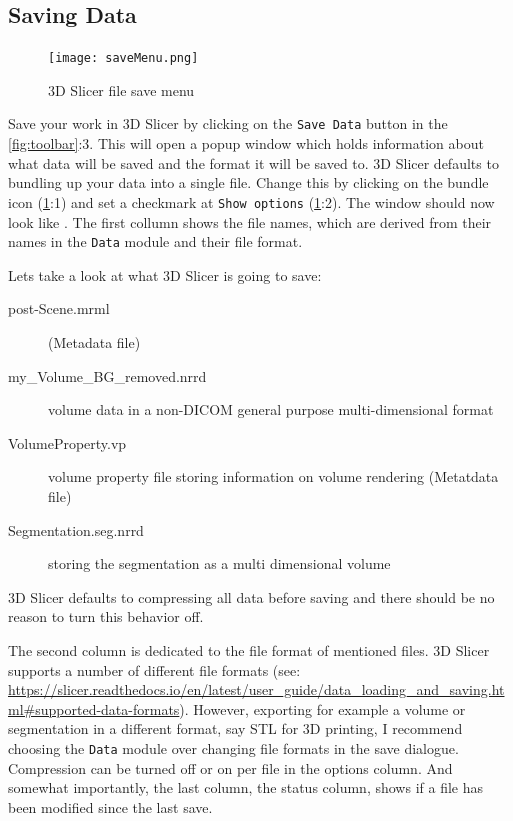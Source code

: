 \subsection{Saving Data}
\begin{figure}[h!]
	\centerline{
		\texttt{[image: saveMenu.png]}}
	\caption{3D Slicer file save menu}\label{fig:save}
\end{figure}
Save your work in 3D Slicer by clicking on the \texttt{Save Data} button in the \cref{fig:toolbar}:3.
This will open a popup window which holds information about what data will be saved and the format it will be saved to.
3D Slicer defaults to bundling up your data into a single file. Change this by clicking on the bundle icon (\cref{fig:save}:1) and set a checkmark at \texttt{Show options} (\cref{fig:save}:2).
The window should now look like .
The first collumn shows the file names, which are derived from their names in the \texttt{Data} module and their file format.

Lets take a look at what 3D Slicer is going to save:

\begin{description}
	\item [post-Scene.mrml] \cite{kikinis3DSlicerPlatform2014} (Metadata file)
	\item [my\_Volume\_BG\_removed.nrrd] volume data in a non-DICOM general purpose multi-dimensional format
	\item [VolumeProperty.vp] volume property file storing information on volume rendering (Metatdata file)
	\item [Segmentation.seg.nrrd] \cite{kikinis3DSlicerPlatform2014} storing the segmentation as a multi dimensional volume
\end{description}

3D Slicer defaults to compressing all data before saving and there should be no reason to turn this behavior off.


The second column is dedicated to the file format of mentioned files.
3D Slicer supports a number of different file formats (see: \url{https://slicer.readthedocs.io/en/latest/user_guide/data_loading_and_saving.html#supported-data-formats}).
However, exporting for example a volume or segmentation in a different format, say STL for 3D printing, I recommend choosing the \texttt{Data} module over changing file formats in the save dialogue.
Compression can be turned off or on per file in the options column.
And somewhat importantly, the last column, the status column, shows if a file has been modified since the last save.

